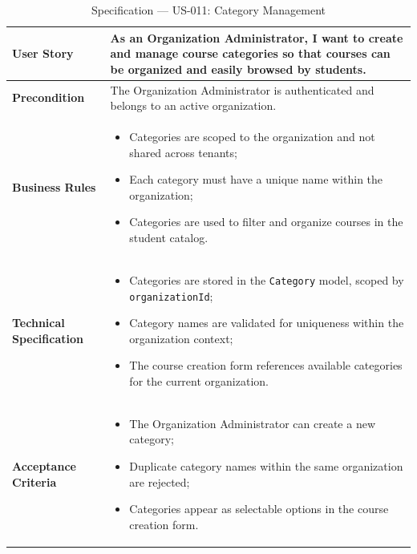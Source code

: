 \begin{table}[H]
\centering
\caption{Specification — US-011: Category Management}
\label{tab:us011}
\renewcommand{\arraystretch}{1}
\begin{tabularx}{\textwidth}{|p{2.5cm}|X|}
\hline
\textbf{User Story} & As an Organization Administrator, I want to create and manage course categories so that courses can be organized and easily browsed by students. \\
\hline
\textbf{Precondition} & The Organization Administrator is authenticated and belongs to an active organization. \\
\hline
\textbf{Business Rules} &
\begin{itemize}
  \item Categories are scoped to the organization and not shared across tenants;
  \item Each category must have a unique name within the organization;
  \item Categories are used to filter and organize courses in the student catalog.
\end{itemize} \\
\hline
\textbf{Technical Specification} &
\begin{itemize}
  \item Categories are stored in the \texttt{Category} model, scoped by \texttt{organizationId};
  \item Category names are validated for uniqueness within the organization context;
  \item The course creation form references available categories for the current organization.
\end{itemize} \\
\hline
\textbf{Acceptance Criteria} &
\begin{itemize}
  \item The Organization Administrator can create a new category;
  \item Duplicate category names within the same organization are rejected;
  \item Categories appear as selectable options in the course creation form.
\end{itemize} \\
\hline
\end{tabularx}
\end{table}

